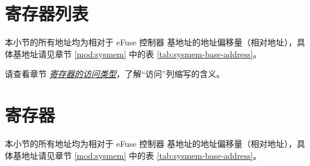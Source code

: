 \documentclass[main\_\_CN.tex]{subfiles}
\begin{document}



\clearpage
\hypertarget{efuse-reg-summ}{}
\section{寄存器列表}
\label{sec:efuse-reg-summ}

本小节的所有地址均为相对于 eFuse 控制器 基地址的地址偏移量（相对地址），具体基地址请见章节 \ref{mod:sysmem} \textit{} 中的表 \ref{tab:sysmem-base-address}。

请查看章节 \hyperref[glossary-access-types]{\textit{寄存器的访问类型}}，了解“访问”列缩写的含义。








\clearpage
\section{寄存器}

本小节的所有地址均为相对于 eFuse 控制器 基地址的地址偏移量（相对地址），具体基地址请见章节 \ref{mod:sysmem} \textit{} 中的表 \ref{tab:sysmem-base-address}。


\end{document}
